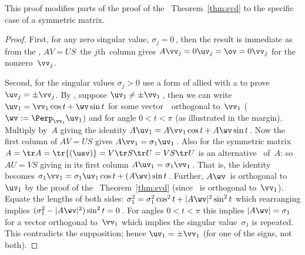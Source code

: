 \begin{aside} This proof modifies parts of the proof of the \svd\ Theorem~\ref{thm:svd} to the specific case of a symmetric matrix.
\end{aside}
\begin{proof} 
First, for any zero singular value, \(\sigma_j=0\)\,, then the result is immediate as from the \svd, \(AV=US\)\, the \(j\)th~column gives \(A\vv_j=0\uv_j=\ov=0\vv_j\) for the nonzero~\(\vv_j\).

Second, for the singular values \(\sigma_j>0\) use a form of  allied with a  to prove \(\uv_j=\pm \vv_j\).
By , suppose \(\uv_1\neq\pm\vv_1\)\,, then we can write \(\uv_1=\vv_1\cos t+\wv\sin t\) for some vector~\wv\ orthogonal to~\(\vv_1\) (\(\wv:=\Perp_{\vv_1}\uv_1\)) and for angle \(0< t<\pi\) (as illustrated in the margin).
Multiply by~\(A\) giving the identity \(A\uv_1=A\vv_1\cos t+A\wv\sin t\)\,.
Now the first column of \(AV=US\) gives \(A\vv_1=\sigma_1\uv_1\)\,.
Also for the symmetric matrix \(A=\tr A=\tr{(\usv)}=V\tr S\tr U=VS\tr U\) is an alternative \svd\ of~\(A\):  
so \(AU=VS\) giving in its first column \(A\uv_1=\sigma_1\vv_1\)\,.
That is, the identity becomes \(\sigma_1\vv_1=\sigma_1\uv_1\cos t+(A\wv)\sin t\)\,.
Further, \(A\wv\)~is orthogonal to~\(\uv_1\) by the proof of the \svd\ Theorem~\ref{thm:svd} (since \wv~is orthogonal to~\(\vv_1\)).  
Equate the lengths of both sides: \(\sigma_1^2=\sigma_1^2\cos^2 t+|A\wv|^2\sin^2 t\) which rearranging implies \((\sigma_1^2-|A\wv|^2) \sin^2 t=0\)\,.
For angles \(0< t<\pi\) this implies \(|A\wv|=\sigma_1\) for a vector orthogonal to~\(\vv_1\) which implies the singular value~\(\sigma_1\) is repeated.  
This contradicts the supposition; hence \(\uv_1=\pm\vv_1\) (for one of the signs, not both).


\end{proof}
